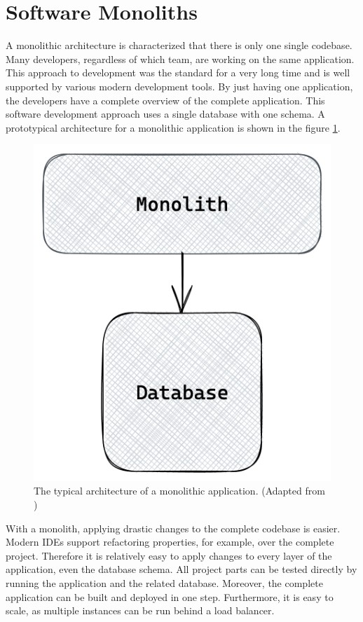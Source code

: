 \section{Software Monoliths}\label{section:background:software-monolith}

A monolithic architecture is characterized that there is only one single codebase. Many developers, regardless of which team, are working on the same application. This approach to development was the standard for a very long time and is well supported by various modern development tools. By just having one application, the developers have a complete overview of the complete application. This software development approach uses a single database with one schema. A prototypical architecture for a monolithic application is shown in the figure \ref{fig:background:monolith:monolith-sketch}.

\ifshowImages
\begin{figure}[H]
    \centering
    \includegraphics[width=0.3\linewidth]{images/background/monolith/monolith-sketch.png}
    \caption{The typical architecture of a monolithic application. (Adapted from \cite[12]{book:2019:newman:background:monolith:monolith-to-microservices})}\label{fig:background:monolith:monolith-sketch}
\end{figure}
\fi

\bigskip

\noindent With a monolith, applying drastic changes to the complete codebase is easier. Modern IDEs support refactoring properties, for example, over the complete project. Therefore it is relatively easy to apply changes to every layer of the application, even the database schema. All project parts can be tested directly by running the application and the related database. Moreover, the complete application can be built and deployed in one step. Furthermore, it is easy to scale, as multiple instances can be run behind a load balancer. \cite[4]{book:2018:richardson:background:bff:microservices-patterns}

\bigskip

